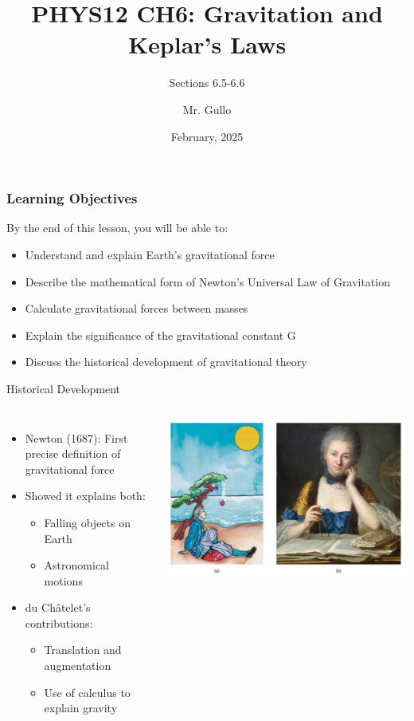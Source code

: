 \documentclass{beamer}
\title[Circular Motion]{PHYS12 CH6: Gravitation and Keplar's Laws}
\subtitle{Sections 6.5-6.6}
\author[Mr. Gullo]{Mr. Gullo}
\date[Feb 2025]{February, 2025}
\begin{document}
\frame{\titlepage}

\begin{frame}
\frametitle{Learning Objectives}
By the end of this lesson, you will be able to:
\begin{itemize}
  \item Understand and explain Earth's gravitational force
        \item Describe the mathematical form of Newton's Universal Law of Gravitation
        \item Calculate gravitational forces between masses
        \item Explain the significance of the gravitational constant G
        \item Discuss the historical development of gravitational theory
\end{itemize}
\end{frame}

\begin{frame}{Historical Development}
    \begin{columns}
        \begin{itemize}
            \item Newton (1687): First precise definition of gravitational force
            \item Showed it explains both:
                \begin{itemize}
                    \item Falling objects on Earth
                    \item Astronomical motions
                \end{itemize}
            \item du Châtelet's contributions:
                \begin{itemize}
                    \item Translation and augmentation
                    \item Use of calculus to explain gravity
                \end{itemize}
        \end{itemize}
        
        \includegraphics[width=\textwidth]{phys12-gravity-newtons-cannon-thought-experiment.png}

        \end{columns}
\end{frame}
\end{document}

